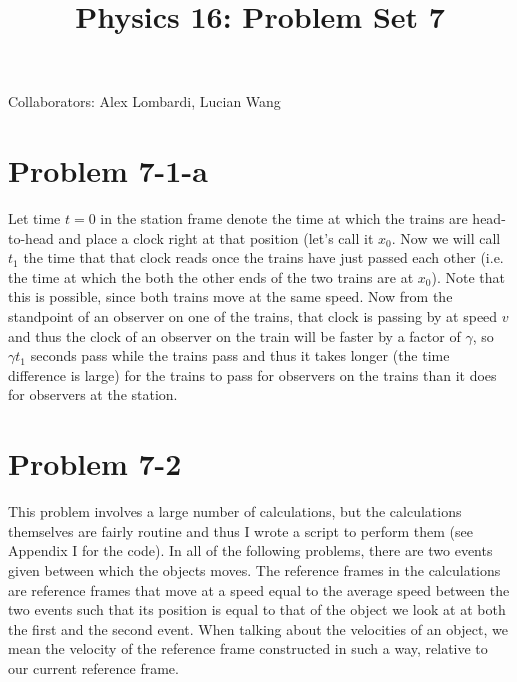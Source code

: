 \title{Physics 16: Problem Set 7}

\maketitle
\begin{center}
Collaborators: Alex Lombardi, Lucian Wang 
\end{center}
\section*{Problem 7-1-a}
Let time $t=0$ in the station frame denote the time at which the trains are head-to-head and place a clock right at that position (let's call it $x_0$. Now we will call $t_1$ the time that that clock reads once the trains have just passed each other (i.e. the time at which the both the other ends of the two trains are at $x_0$). Note that this is possible, since both trains move at the same speed. Now from the standpoint of an observer on one of the trains, that clock is passing by at speed $v$ and thus the clock of an observer on the train will be faster by a factor of $\gamma$, so $\gamma t_1$ seconds pass while the trains pass and thus it takes longer (the time difference is large) for the trains to pass for observers on the trains than it does for observers at the station.
\section*{Problem 7-2}
This problem involves a large number of calculations, but the calculations themselves are fairly routine and thus I wrote a script to perform them (see Appendix I for the code). In all of the following problems, there are two events given between which the objects moves. The reference frames in the calculations are reference frames that move at a speed equal to the average speed between the two events such that its position is equal to that of the object we look at at both the first and the second event. When talking about the velocities of an object, we mean the velocity of the reference frame constructed in such a way, relative to our current reference frame. 
